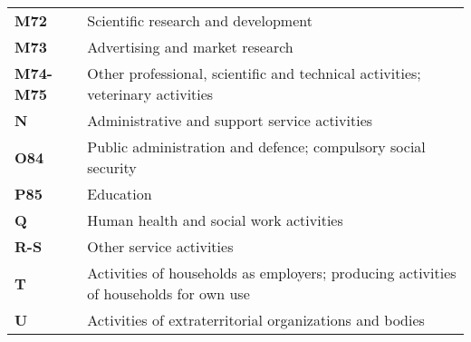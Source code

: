 \documentclass[11pt,a4paper]{article}
\begin{document}
\begin{table}[!h]
\begin{tabular}{ll}
\textbf{M72} &{Scientific research and development}\\
\textbf{M73} &{Advertising and market research}\\
\textbf{M74-M75} &{Other professional, scientific and technical activities; veterinary activities}\\
\textbf{N} &{Administrative and support service activities}\\
\textbf{O84} &{Public administration and defence; compulsory social security}\\
\textbf{P85} &{Education}\\
\textbf{Q} &{Human health and social work activities}\\
\textbf{R-S} &{Other service activities}\\
\textbf{T} &{Activities of households as employers; producing activities of households for own use}\\
\textbf{U} &{Activities of extraterritorial organizations and bodies}\\
  	\end{tabular}
\label{tab:wiodindustries}
\end{table}
\end{document}
